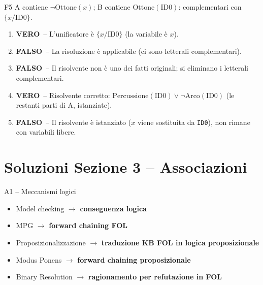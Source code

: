 \documentclass[12pt,a4paper]{article}
\newcommand{\V}{\textcolor{green!60!black}{\textbf{VERO}}}
\newcommand{\F}{\textcolor{red!70!black}{\textbf{FALSO}}}
\begin{document}
\begin{risposta}{F5}
A contiene $\neg\text{Ottone}(x)$; B contiene $\text{Ottone}(\text{ID0})$: complementari con $\{x/\text{ID0}\}$.
\begin{enumerate}[noitemsep, label=\arabic*.]
  \item \V\ -- L'unificatore è $\{x/\text{ID0}\}$ (la variabile è $x$).
  \item \F\ -- La risoluzione è applicabile (ci sono letterali complementari).
  \item \F\ -- Il risolvente non è uno dei fatti originali; si eliminano i letterali complementari.
  \item \V\ -- Risolvente corretto: $\text{Percussione}(\text{ID0}) \lor \neg\text{Arco}(\text{ID0})$ (le restanti parti di A, istanziate).
  \item \F\ -- Il risolvente è istanziato ($x$ viene sostituita da \texttt{ID0}), non rimane con variabili libere.
\end{enumerate}
\end{risposta}

\section*{Soluzioni Sezione 3 -- Associazioni}

\begin{risposta}{A1 -- Meccanismi logici}
\begin{itemize}[noitemsep]
  \item Model checking $\to$ \textbf{conseguenza logica}
  \item MPG $\to$ \textbf{forward chaining FOL}
  \item Proposizionalizzazione $\to$ \textbf{traduzione KB FOL in logica proposizionale}
  \item Modus Ponens $\to$ \textbf{forward chaining proposizionale}
  \item Binary Resolution $\to$ \textbf{ragionamento per refutazione in FOL}
\end{itemize}
\end{risposta}
\end{document}
